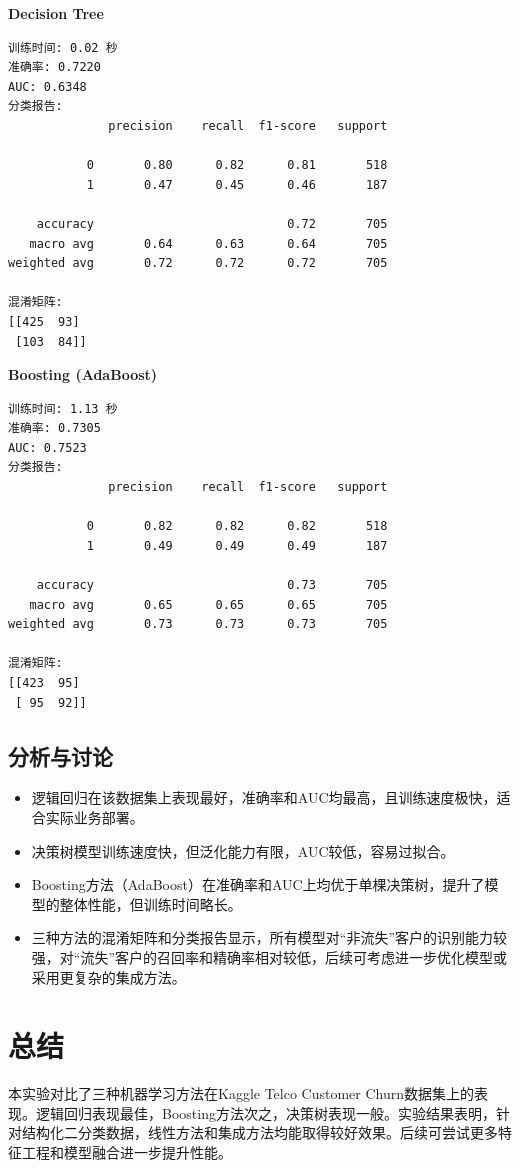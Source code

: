 \documentclass[12pt,a4paper]{article}
\begin{document}
\textbf{Decision Tree}
\begin{lstlisting}
训练时间: 0.02 秒
准确率: 0.7220
AUC: 0.6348
分类报告:
              precision    recall  f1-score   support

           0       0.80      0.82      0.81       518
           1       0.47      0.45      0.46       187

    accuracy                           0.72       705
   macro avg       0.64      0.63      0.64       705
weighted avg       0.72      0.72      0.72       705

混淆矩阵:
[[425  93]
 [103  84]]
\end{lstlisting}

\textbf{Boosting (AdaBoost)}
\begin{lstlisting}
训练时间: 1.13 秒
准确率: 0.7305
AUC: 0.7523
分类报告:
              precision    recall  f1-score   support

           0       0.82      0.82      0.82       518
           1       0.49      0.49      0.49       187

    accuracy                           0.73       705
   macro avg       0.65      0.65      0.65       705
weighted avg       0.73      0.73      0.73       705

混淆矩阵:
[[423  95]
 [ 95  92]]
\end{lstlisting}

\subsection{分析与讨论}
\begin{itemize}
    \item 逻辑回归在该数据集上表现最好，准确率和AUC均最高，且训练速度极快，适合实际业务部署。
    \item 决策树模型训练速度快，但泛化能力有限，AUC较低，容易过拟合。
    \item Boosting方法（AdaBoost）在准确率和AUC上均优于单棵决策树，提升了模型的整体性能，但训练时间略长。
    \item 三种方法的混淆矩阵和分类报告显示，所有模型对“非流失”客户的识别能力较强，对“流失”客户的召回率和精确率相对较低，后续可考虑进一步优化模型或采用更复杂的集成方法。
\end{itemize}

\section{总结}
本实验对比了三种机器学习方法在Kaggle Telco Customer Churn数据集上的表现。逻辑回归表现最佳，Boosting方法次之，决策树表现一般。实验结果表明，针对结构化二分类数据，线性方法和集成方法均能取得较好效果。后续可尝试更多特征工程和模型融合进一步提升性能。
\end{document}
